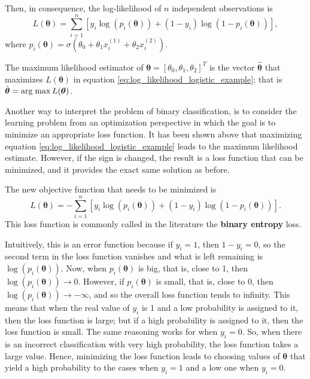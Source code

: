 Then, in consequence, the log-likelihood of $n$ independent observations is
\begin{equation}
  \label{eq:log_likelihood_logistic_example}
  L(\boldsymbol{\theta}) = \sum_{i = 1}^n \left[ y_i \log\left( p_i(\boldsymbol{\theta}) \right) + (1 - y_i) \log \left( 1 - p_i(\boldsymbol{\theta}) \right) \right],
\end{equation}
where $p_i(\boldsymbol{\theta}) = \sigma(\theta_0 + \theta_1 x_i^{(1)} + \theta_2 x_i^{(2)})$.

The maximum likelihood estimator of $\boldsymbol{\theta} = \left[ \theta_0, \theta_1, \theta_2 \right]^T$ is the vector $\hat{\boldsymbol{\theta}}$ that maximizes $L(\boldsymbol{\theta})$ in equation \eqref{eq:log_likelihood_logistic_example}; that is $\hat{\boldsymbol{\theta}} = \operatorname*{arg\; max} L(\boldsymbol{\theta})$.

Another way to interpret the problem of binary classification, is to consider the learning problem from an optimization perspective in which the goal is to minimize an appropriate loss function. It has been shown above that maximizing equation \eqref{eq:log_likelihood_logistic_example} leads to the maximum likelihood estimate. However, if the sign is changed, the result is a loss function that can be minimized, and it provides the exact same solution as before.

The new objective function that needs to be minimized is
\begin{equation}
  \label{eq:logistic_example_loss_function}
  L(\boldsymbol{\theta}) = - \sum_{i = 1}^n \left[ y_i \log\left( p_i(\boldsymbol{\theta}) \right) + (1 - y_i) \log \left( 1 - p_i(\boldsymbol{\theta}) \right) \right].
\end{equation}
This loss function is commonly called in the literature the \textbf{binary entropy} loss.

Intuitively, this is an error function because if $y_i = 1$, then $1 - y_i = 0$, so the second term in the loss function vanishes and what is left remaining is $\log\left( p_i(\boldsymbol{\theta}) \right)$. Now, when $p_i(\boldsymbol{\theta})$ is big, that is, close to 1, then $\log\left( p_i(\boldsymbol{\theta}) \right) \to 0$. However, if $p_i(\boldsymbol{\theta})$ is small, that is, close to 0, then $\log\left( p_i(\boldsymbol{\theta}) \right) \to -\infty$, and so the overall loss function tends to infinity. This means that when the real value of $y_i$ is 1 and a low probability is assigned to it, then the loss function is large; but if a high probability is assigned to it, then the loss function is small. The same reasoning works for when $y_i = 0$. So, when there is an incorrect classification with very high probability, the loss function takes a large value.
Hence, minimizing the loss function leads to choosing values of $\boldsymbol{\theta}$ that yield a high probability to the cases when $y_i = 1$ and a low one when $y_i = 0$.

